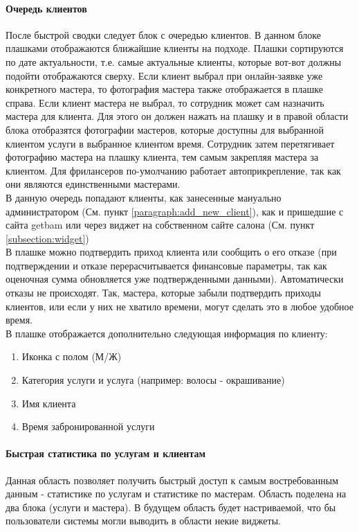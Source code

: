 \documentclass[DIV=calc, paper=a4, fontsize=11pt]{scrartcl} %
\begin{document}
\paragraph{Очередь клиентов} \label{paragraph:plashki}
После быстрой сводки следует блок с очередью клиентов. В данном блоке плашками отображаются ближайшие клиенты на подходе. Плашки сортируются по дате актуальности, т.е. самые актуальные клиенты, которые вот-вот должны подойти отображаются сверху. Если клиент выбрал при онлайн-заявке уже конкретного мастера, то фотография мастера также отображается в плашке справа. Если клиент мастера не выбрал, то сотрудник может сам назначить мастера для клиента. Для этого он должен нажать на плашку и в правой области блока отобразятся фотографии мастеров, которые доступны для выбранной клиентом услуги в выбранное клиентом время. Сотрудник затем перетягивает фотографию мастера на плашку клиента, тем самым закрепляя мастера за клиентом. Для фрилансеров по-умолчанию работает автоприкрепление, так как они являются единственными мастерами.
\\[0.5cm]
В данную очередь попадают клиенты, как занесенные мануально администратором (См. пункт \ref{paragraph:add_new_client}), как и пришедшие с сайта getbam или через виджет на собственном сайте салона (См. пункт \ref{subsection:widget})
\\[0.5cm]
В плашке можно подтвердить приход клиента или сообщить о его отказе (при подтверждении и отказе перерасчитывается финансовые параметры, так как оценочная сумма обновляется уже подтвержденными данными). Автоматически отказы не происходят. Так, мастера, которые забыли подтвердить приходы клиентов, или если у них не хватило времени, могут сделать это в любое удобное время. 
\\[0.5cm]
В плашке отображается дополнительно следующая информация по клиенту:

    \begin{enumerate}
        \item Иконка с полом (М/Ж)
        \item Категория услуги и услуга (например: волосы - окрашивание)
        \item Имя клиента
        \item Время забронированной услуги
    \end{enumerate}
    
\paragraph{Быстрая статистика по услугам и клиентам}
Данная область позволяет получить быстрый доступ к самым востребованным данным - статистике по услугам и статистике по мастерам. Область поделена на два блока (услуги и мастера). В будущем область будет настриваемой, что бы пользователи системы могли выводить в области некие виджеты.
\end{document}
